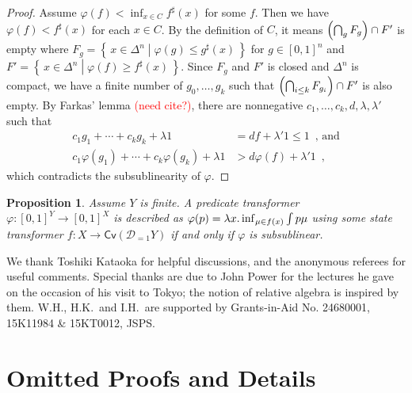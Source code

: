 \documentclass[9pt, preprint]{sigplanconf}
\theoremstyle{theorem}
\newtheorem{proposition}[theorem]{Proposition}
\theoremstyle{definition}
\newcommand{\memo}[1]{\textcolor{red}{(#1)}}
\renewcommand{\phi}{\varphi}
\newcommand{\dist}{\mathcal{D}_{=1}}
\newcommand{\set}[2]{\left\{\, #1 \mathrel{}\middle|\mathrel{} #2 \,\right\}}
\newcommand{\uintv}{[0, 1]}
\DeclarePairedDelimiter\p{(}{)}
\newcommand{\lt}{<}
\newcommand{\gt}{>}
\newcommand{\RC}{\mathsf{Cv}}
\begin{document}
{\begin{proof}
  Assume $\phi(f) \lt \inf_{x \in C} f^{\sharp}(x)$ for some $f$.
  Then we have $\phi(f) \lt f^{\sharp}(x)$ for each $x \in C$.
  By the definition of $C$, it means $\p*{\bigcap_{g} F_g} \cap F'$
  is empty where
  $F_g = \set{x \in \Delta^n}{ \phi(g) \leq g^{\sharp}(x) }$
  for $g \in \uintv^n$ and
  $F' = \set{x \in \Delta^n}{ \phi(f) \geq f^{\sharp}(x) }$.
  Since $F_g$ and $F'$ is closed and $\Delta^n$ is compact,
  we have a finite number of $g_0, \ldots, g_k$ such that
  $\p*{\bigcap_{i \le k} F_{g_i}} \cap F'$ is also empty.
  By Farkas' lemma \memo{need cite?}, there are nonnegative
  $c_1, \ldots, c_k, d, \lambda, \lambda'$ such that
  \begin{align*}
    c_1 g_1 + \cdots + c_k g_k + \lambda 1 &= d f + \lambda' 1 \le 1 \enspace \text{, and} \\
    c_1 \phi(g_1) + \cdots + c_k \phi(g_k) + \lambda 1 &\gt d \phi(f) + \lambda' 1
    \enspace ,
  \end{align*}
  which contradicts the subsublinearity of $\phi$.
\end{proof}

\begin{proposition}
  Assume $Y$ is finite.
  A predicate transformer $\phi \colon \uintv^Y \to \uintv^X$ is described
  as $\phi(p) = \lambda x \ldotp \inf_{\mu \in f(x)} \int p \mu$
  using some state transformer $f \colon X \to \RC (\dist Y)$
  if and only if $\phi$ is subsublinear.


\end{proposition}
}










\acks
We thank Toshiki Kataoka for helpful discussions, and the anonymous
referees for useful comments. Special thanks are due
to John Power for the lectures he gave on the occasion of his visit to
Tokyo; the notion of relative algebra is inspired by them.
W.H., H.K.\ and I.H.\ are
 supported by Grants-in-Aid No. 24680001, 15K11984 \& 15KT0012,
 JSPS.












\newpage
\appendix
\section{Omitted Proofs and Details}
\end{document}
